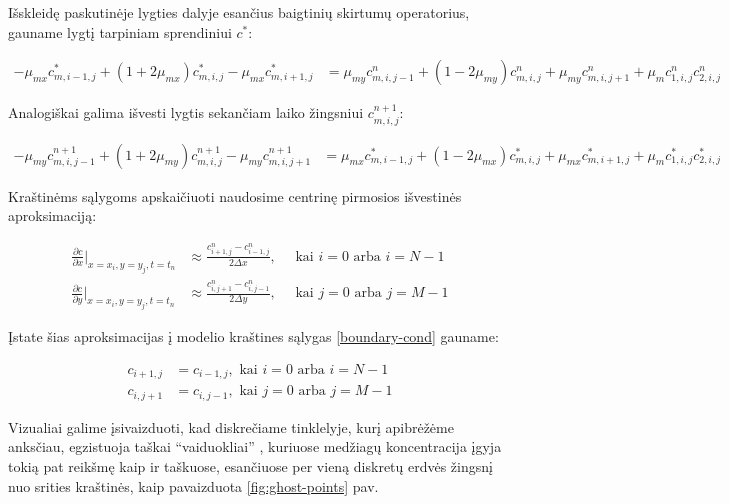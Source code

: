Išskleidę paskutinėje lygties dalyje esančius baigtinių skirtumų operatorius, gauname lygtį tarpiniam sprendiniui $c^*$:

\begin{align} \label{eqs:adi-short-half}
  -\mu_{mx}c^{*}_{m,i-1,j}+(1+2\mu_{mx})c^{*}_{m,i,j}-\mu_{mx}c^{*}_{m,i+1,j}
  &= \mu_{my}c^n_{m,i,j-1}+(1-2\mu_{my})c^n_{m,i,j}+\mu_{my}c^n_{m,i,j+1}+\mu_m c^n_{1,i,j}c^n_{2,i,j}
\end{align}

Analogiškai galima išvesti lygtis sekančiam laiko žingsniui $c^{n+1}_{m,i,j}$:

\begin{align} \label{eqs:adi-short-next}
  -\mu_{my}c^{n+1}_{m,i,j-1}+(1+2\mu_{my})c^{n+1}_{m,i,j}-\mu_{my}c^{n+1}_{m,i,j+1}
  &= \mu_{mx}c^*_{m,i-1,j}+(1-2\mu_{mx})c^*_{m,i,j}+\mu_{mx}c^*_{m,i+1,j}+\mu_m c^*_{1,i,j}c^*_{2,i,j}
\end{align}

Kraštinėms sąlygoms apskaičiuoti naudosime centrinę pirmosios išvestinės aproksimaciją:

\begin{align*}
  \frac{\partial c}{\partial x}\Big|_{x=x_i, y=y_j, t=t_n} 
  &\approx \frac{c^n_{i+1,j}-c^n_{i-1,j}}{2\Delta x},\quad
  \text{ kai } i = 0 \text{ arba } i = N - 1
  \\
  \frac{\partial c}{\partial y}\Big|_{x=x_i, y=y_j, t=t_n} 
  &\approx \frac{c^n_{i,j+1}-c^n_{i,j-1}}{2\Delta y},\quad
  \text{ kai } j = 0 \text{ arba } j = M - 1
\end{align*}

Įstate šias aproksimacijas į modelio kraštines sąlygas \eqref{boundary-cond} gauname:

\begin{subequations} \label{boundary-cond-approx}
\begin{align} 
  c_{i+1,j} &= c_{i-1,j}, \text{ kai } i = 0 \text{ arba } i = N-1 \\
  c_{i,j+1} &= c_{i,j-1}, \text{ kai } j = 0 \text{ arba } j = M-1
\end{align}
\end{subequations}

\newpage

Vizualiai galime įsivaizduoti, kad diskrečiame tinklelyje, kurį apibrėžėme anksčiau, egzistuoja taškai \enquote{vaiduokliai} \cite{cocoFinitedifferenceGhostpointMultigrid2013}, kuriuose medžiagų koncentracija įgyja tokią pat reikšmę kaip ir taškuose, esančiuose per vieną diskretų erdvės žingsnį nuo srities kraštinės, kaip pavaizduota \ref{fig:ghost-points} pav.

